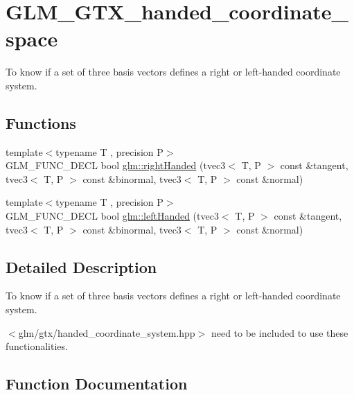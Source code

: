 \hypertarget{group__gtx__handed__coordinate__space}{}\section{G\+L\+M\+\_\+\+G\+T\+X\+\_\+handed\+\_\+coordinate\+\_\+space}
\label{group__gtx__handed__coordinate__space}


To know if a set of three basis vectors defines a right or left-\/handed coordinate system.  


\subsection*{Functions}
\begin{DoxyCompactItemize}
\item 
{\footnotesize template$<$typename T , precision P$>$ }\\G\+L\+M\+\_\+\+F\+U\+N\+C\+\_\+\+D\+E\+C\+L bool \hyperlink{group__gtx__handed__coordinate__space_ga17cd83888de8755c0435c589fafd3603}{glm\+::right\+Handed} (tvec3$<$ T, P $>$ const \&tangent, tvec3$<$ T, P $>$ const \&binormal, tvec3$<$ T, P $>$ const \&normal)
\item 
{\footnotesize template$<$typename T , precision P$>$ }\\G\+L\+M\+\_\+\+F\+U\+N\+C\+\_\+\+D\+E\+C\+L bool \hyperlink{group__gtx__handed__coordinate__space_ga7425e0ebfe6a56919900a072ae1f8017}{glm\+::left\+Handed} (tvec3$<$ T, P $>$ const \&tangent, tvec3$<$ T, P $>$ const \&binormal, tvec3$<$ T, P $>$ const \&normal)
\end{DoxyCompactItemize}


\subsection{Detailed Description}
To know if a set of three basis vectors defines a right or left-\/handed coordinate system. 

$<$glm/gtx/handed\+\_\+coordinate\+\_\+system.\+hpp$>$ need to be included to use these functionalities. 

\subsection{Function Documentation}
\hypertarget{group__gtx__handed__coordinate__space_ga7425e0ebfe6a56919900a072ae1f8017}{}
